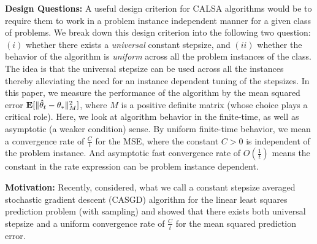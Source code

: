 \textbf{Design Questions:} A useful design criterion for CALSA algorithms would be to require them to work in a problem instance independent manner for a given class of  problems. We break down this design criterion into the following two question: $(i)$ whether there exists a \emph{universal} constant stepsize, and $(ii)$ whether the behavior of the algorithm is \emph{uniform} across all the problem instances of the class. The idea is that the universal stepsize can be used across all the instances thereby alleviating the need for an instance dependent tuning of the stepsizes. In this paper, we measure the performance of the algorithm by the mean squared error $\mathbf{E}[\| \hat{\theta}_t-\theta_*\|^2_M]$, where $M$ is a positive definite matrix (whose choice plays a critical role). Here, we look at algorithm behavior in the finite-time, as well as asymptotic (a weaker condition) sense. By uniform finite-time behavior, we mean a convergence rate of $\frac{C}{t}$ for the MSE, where the constant $C>0$ is independent of the problem instance. And asymptotic fast convergence rate of $O(\frac{1}{t})$ means the constant in the rate expression can be problem instance dependent.

\textbf{Motivation:} Recently, \citet{bach} considered, what we call a constant stepsize averaged stochastic gradient descent (CASGD) 
 algorithm for the linear least squares prediction problem (with \iid sampling) and showed that there exists both universal stepsize and a uniform convergence rate of $\frac{C}{t}$ for the mean squared prediction error.

